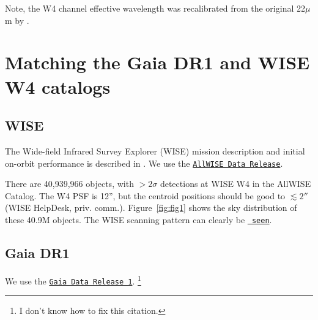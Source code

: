 \documentclass[usenatbib]{mn2e}
\begin{document}
Note, the W4 channel effective wavelength was recalibrated from the
original 22$\mu$m by \citet{Brown14b}.


\section{Matching the Gaia DR1 and WISE W4 catalogs}

    \subsection{WISE}
    The Wide-field Infrared Survey Explorer (WISE) mission description and
    initial on-orbit performance is described in \citet[][]{Wright10}.
    We use the \href{http://wise2.ipac.caltech.edu/docs/release/allwise/expsup/}
    {\tt AllWISE Data Release}. 

    There are 40,939,966 objects, with $>2\sigma$ detections at WISE
    W4 in the AllWISE Catalog. The W4 PSF is 12'', but the centroid
    positions should be good to $\lesssim2''$ (WISE HelpDesk,
    priv. comm.).  Figure~\ref{fig:fig1} shows the sky distribution of
    these 40.9M objects.  The WISE scanning pattern can clearly be 
    \href{http://wise2.ipac.caltech.edu/docs/release/allwise/expsup/sec4_2.html}{{\tt
      seen}}.

    \subsection{Gaia DR1} 
    We use the \href{https://www.cosmos.esa.int/web/gaia/dr1}{{\tt Gaia Data Release 1}}.
    \citep{Gaia16a, Gaia16b}\footnote{I don't know how to fix this citation.}
\end{document}
